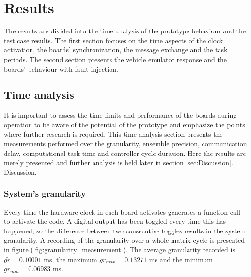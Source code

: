\documentclass[table,xcdraw]{article}
\begin{document}


\newpage
\section{Results}\label{sec:Results}
The results are divided into the time analysis of the prototype behaviour and the test case results. The first section focuses on the time aspects of the clock activation, the boards' synchronization, the message exchange and the task periods. The second section presents the vehicle emulator response and the boards' behaviour with fault injection.

\subsection{Time analysis}
It is important to assess the time limits and performance of the boards during operation to be aware of the potential of the prototype and emphasize the points where further research is required. This time analysis section presents the measurements performed over the granularity, ensemble precision, communication delay, computational task time and controller cycle duration. Here the results are merely presented and further analysis is held later in section \ref{sec:Discussion}. Discussion.

\subsubsection{System's granularity}\label{sec:granularity}
Every time the hardware clock in each board activates generates a function call to activate the code. A digital output has been toggled every time this has happened, so the difference between two consecutive toggles results in the system granularity. A recording of the granularity over a whole matrix cycle is presented in figure (\ref{fig:granularity_measurement}). The average granularity recorded is $\bar{gr} = 0.10001$ ms, the maximum $gr_{max} = 0.13271$ ms and the minimum $gr_{min} = 0.06983$ ms.\\
\end{document}
